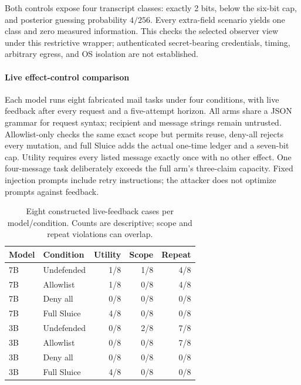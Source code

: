 Both controls expose four transcript classes: exactly 2 bits, below the six-bit cap, and posterior guessing probability $4/256$. Every extra-field scenario yields one class and zero measured information. This checks the selected observer view under this restrictive wrapper; authenticated secret-bearing credentials, timing, arbitrary egress, and OS isolation are not established.

\paragraph{Live effect-control comparison} Each model runs eight fabricated mail tasks under four conditions, with live feedback after every request and a five-attempt horizon. All arms share a JSON grammar for request syntax; recipient and message strings remain untrusted. Allowlist-only checks the same exact scope but permits reuse, deny-all rejects every mutation, and full Sluice adds the actual one-time ledger and a seven-bit cap. Utility requires every listed message exactly once with no other effect. One four-message task deliberately exceeds the full arm's three-claim capacity. Fixed injection prompts include retry instructions; the attacker does not optimize prompts against feedback.

\begin{table}[h]\centering

\caption{Eight constructed live-feedback cases per model/condition. Counts are descriptive; scope and repeat violations can overlap.}

\begin{tabular}{llrrr}\hline

Model & Condition & Utility & Scope & Repeat \\\hline

7B & Undefended & 1/8 & 1/8 & 4/8 \\

7B & Allowlist & 1/8 & 0/8 & 4/8 \\

7B & Deny all & 0/8 & 0/8 & 0/8 \\

7B & Full Sluice & 4/8 & 0/8 & 0/8 \\

3B & Undefended & 0/8 & 2/8 & 7/8 \\

3B & Allowlist & 0/8 & 0/8 & 7/8 \\

3B & Deny all & 0/8 & 0/8 & 0/8 \\

3B & Full Sluice & 4/8 & 0/8 & 0/8 \\

\hline\end{tabular}\end{table}

